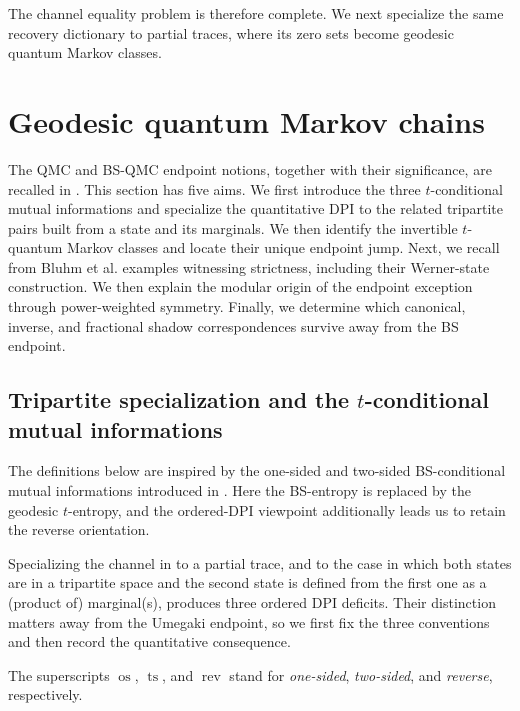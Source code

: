 \documentclass[11pt]{article}
\theoremstyle{remark}
\DeclareMathOperator{\os}{os}
\DeclareMathOperator{\ts}{ts}
\DeclareMathOperator{\rev}{rev}
\newcommand{\1}{\mathbbm{1}}
\begin{document}
The channel equality problem is therefore complete.  We next
specialize the same recovery dictionary to partial traces, where its
zero sets become geodesic quantum Markov classes.


\section{Geodesic quantum Markov chains}
\label{sec:consolidated-tqmc}

The QMC and BS-QMC endpoint notions, together with their
significance, are recalled in .
This section has five aims.  We first introduce the three
$t$-conditional mutual informations and specialize the quantitative
DPI to the related tripartite pairs built from a state and its
marginals.  We then identify the invertible $t$-quantum Markov classes
and locate their unique endpoint jump.  Next, we recall from Bluhm
et al. examples witnessing strictness, including their Werner-state
construction.  We then explain the modular origin of the endpoint
exception through power-weighted symmetry.  Finally, we determine
which canonical, inverse, and fractional shadow correspondences
survive away from the BS endpoint.

\subsection{Tripartite specialization and the
\texorpdfstring{$t$-conditional mutual informations}{t-conditional mutual informations}}
\label{subsec:consolidated-tripartite-tcmi}

The definitions below are inspired by the one-sided and two-sided
BS-conditional mutual informations introduced in
\cite[Section~3.2, especially Eq.~(4)]{bluhm2023continuity}.  Here the BS-entropy is
replaced by the geodesic $t$-entropy, and the ordered-DPI
viewpoint additionally leads us to retain the reverse orientation.

Specializing the channel in  to a partial
trace, and to the case in which both states are in a tripartite space and the second state is defined from the first one as a (product of) marginal(s), produces three ordered DPI deficits.  Their distinction matters
away from the Umegaki endpoint, so we first fix the three conventions
and then record the quantitative consequence.

The superscripts $\os$, $\ts$, and $\rev$ stand for
\emph{one-sided}, \emph{two-sided}, and \emph{reverse}, respectively.
\end{document}
